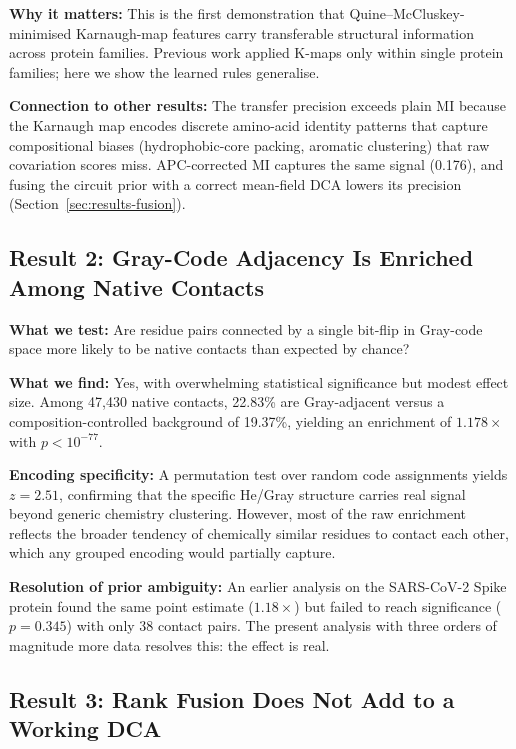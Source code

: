 \textbf{Why it matters:} This is the first demonstration that
Quine--McCluskey-minimised Karnaugh-map features carry transferable structural
information across protein families.  Previous work applied K-maps only within
single protein families; here we show the learned rules generalise.

\textbf{Connection to other results:} The transfer precision exceeds plain MI
because the Karnaugh map encodes discrete amino-acid identity patterns that
capture compositional biases (hydrophobic-core packing, aromatic clustering)
that raw covariation scores miss.  APC-corrected MI captures the same
signal (0.176), and fusing the circuit prior with a correct mean-field DCA
lowers its precision (Section~\ref{sec:results-fusion}).

\subsection{Result 2: Gray-Code Adjacency Is Enriched Among Native Contacts}

\textbf{What we test:} Are residue pairs connected by a single bit-flip in
Gray-code space more likely to be native contacts than expected by chance?

\textbf{What we find:} Yes, with overwhelming statistical significance but
modest effect size.  Among 47{,}430 native contacts, 22.83\% are Gray-adjacent
versus a composition-controlled background of 19.37\%, yielding an enrichment
of $1.178\times$ with $p < 10^{-77}$.

\textbf{Encoding specificity:} A permutation test over random code assignments
yields $z = 2.51$, confirming that the specific He/Gray structure carries real
signal beyond generic chemistry clustering.  However, most of the raw
enrichment reflects the broader tendency of chemically similar residues to
contact each other, which any grouped encoding would partially capture.

\textbf{Resolution of prior ambiguity:} An earlier analysis on the SARS-CoV-2
Spike protein found the same point estimate ($1.18\times$) but failed to reach
significance ($p = 0.345$) with only 38 contact pairs.  The present analysis
with three orders of magnitude more data resolves this: the effect is real.

\subsection{Result 3: Rank Fusion Does Not Add to a Working DCA}

